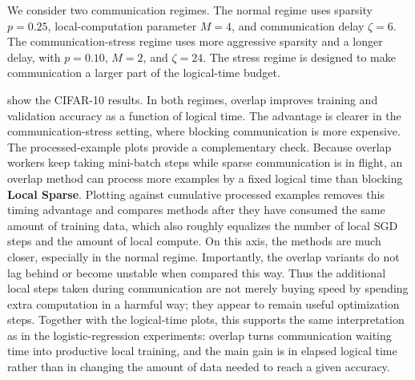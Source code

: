 \documentclass{article}
\theoremstyle{plain}
\theoremstyle{definition}
\begin{document}
We consider two communication regimes.
The normal regime uses sparsity \(p=0.25\), local-computation parameter \(M=4\), and communication delay \(\zeta=6\).
The communication-stress regime uses more aggressive sparsity and a longer delay, with \(p=0.10\), \(M=2\), and \(\zeta=24\).
The stress regime is designed to make communication a larger part of the logical-time budget.

 show the CIFAR-10 results.
In both regimes, overlap improves training and validation accuracy as a function of logical time.
The advantage is clearer in the communication-stress setting, where blocking communication is more expensive.
The processed-example plots provide a complementary check.
Because overlap workers keep taking mini-batch steps while sparse communication is in flight, an overlap method can process more examples by a fixed logical time than blocking \textbf{Local Sparse}.
Plotting against cumulative processed examples removes this timing advantage and compares methods after they have consumed the same amount of training data, which also roughly equalizes the number of local SGD steps and the amount of local compute.
On this axis, the methods are much closer, especially in the normal regime.
Importantly, the overlap variants do not lag behind or become unstable when compared this way.
Thus the additional local steps taken during communication are not merely buying speed by spending extra computation in a harmful way; they appear to remain useful optimization steps.
Together with the logical-time plots, this supports the same interpretation as in the logistic-regression experiments: overlap turns communication waiting time into productive local training, and the main gain is in elapsed logical time rather than in changing the amount of data needed to reach a given accuracy.
\end{document}

